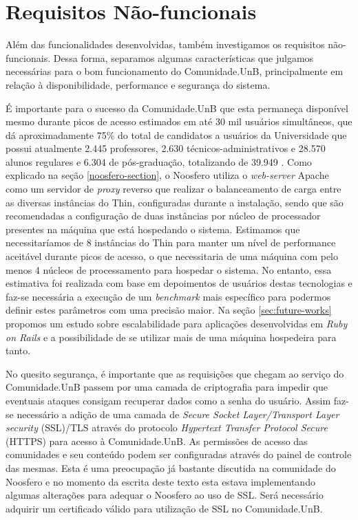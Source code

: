\section{Requisitos Não-funcionais}

Além das funcionalidades desenvolvidas, também investigamos os requisitos
não-funcionais. Dessa forma, separamos algumas características que
julgamos necessárias para o bom funcionamento do Comunidade.UnB, principalmente
em relação à disponibilidade, performance e segurança do sistema.

É importante para o sucesso da Comunidade.UnB que esta permaneça disponível
mesmo durante picos de acesso estimados em até 30 mil usuários simultâneos,
que dá aproximadamente 75\% do total de candidatos a usuários da Universidade
que possui atualmente 2.445 professores, 2.630 técnicos-administrativos
e 28.570 alunos regulares e 6.304 de pós-graduação, totalizando de 39.949
\cite{unbInstituicao}. Como explicado na seção \ref{noosfero-section}, o Noosfero
utiliza o \textit{web-server} Apache como um servidor de \textit{proxy} reverso
que realizar o balanceamento de carga entre as diversas instâncias do Thin,
configuradas durante a instalação, sendo que são recomendadas a configuração de
duas instâncias por núcleo de processador presentes na máquina que está
hospedando o sistema.
%
Estimamos que necessitaríamos de 8 instâncias do Thin
para manter um nível de performance aceitável durante picos de acesso, o que
necessitaria de uma máquina com pelo menos 4 núcleos de processamento para
hospedar o sistema. No entanto, essa estimativa foi realizada com base em
depoimentos de usuários destas tecnologias e faz-se necessária a execução de
um \textit{benchmark} mais específico para podermos definir estes parâmetros com
uma precisão maior.
%
Na seção \ref{sec:future-works} propomos um estudo sobre escalabilidade para
aplicações desenvolvidas em \textit{Ruby on Rails} e a possibilidade de se
utilizar mais de uma máquina hospedeira para tanto.

No quesito segurança, é importante que as requisições que chegam ao serviço
do Comunidade.UnB passem por uma camada de criptografia para impedir que
eventuais ataques consigam recuperar dados como a senha do usuário. Assim faz-se
necessário a adição de uma camada de \textit{Secure Socket Layer/Transport
Layer security} (SSL)/TLS através do protocolo \textit{Hypertext Transfer
Protocol Secure} (HTTPS) para acesso à Comunidade.UnB. As permissões de acesso das
comunidades e seu conteúdo podem ser configuradas através do painel de controle
das mesmas. Esta é uma preocupação já bastante discutida na comunidade do
Noosfero e no momento da escrita deste texto esta estava implementando algumas
alterações para adequar o Noosfero ao uso de SSL. Será necessário adquirir um
certificado válido para utilização de SSL no Comunidade.UnB.

